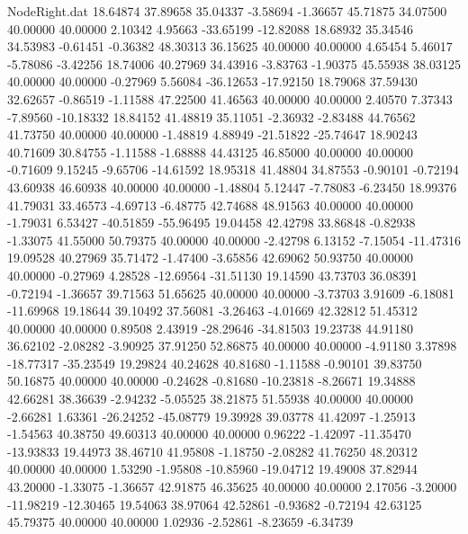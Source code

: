 \begin{filecontents}{NodeRight.dat}
  18.64874   37.89658   35.04337    -3.58694   -1.36657   45.71875   34.07500   40.00000   40.00000    2.10342    4.95663  -33.65199  -12.82088
  18.68932   35.34546   34.53983    -0.61451   -0.36382   48.30313   36.15625   40.00000   40.00000    4.65454    5.46017   -5.78086   -3.42256
  18.74006   40.27969   34.43916    -3.83763   -1.90375   45.55938   38.03125   40.00000   40.00000   -0.27969    5.56084  -36.12653  -17.92150
  18.79068   37.59430   32.62657    -0.86519   -1.11588   47.22500   41.46563   40.00000   40.00000    2.40570    7.37343   -7.89560  -10.18332
  18.84152   41.48819   35.11051    -2.36932   -2.83488   44.76562   41.73750   40.00000   40.00000   -1.48819    4.88949  -21.51822  -25.74647
  18.90243   40.71609   30.84755    -1.11588   -1.68888   44.43125   46.85000   40.00000   40.00000   -0.71609    9.15245   -9.65706  -14.61592
  18.95318   41.48804   34.87553    -0.90101   -0.72194   43.60938   46.60938   40.00000   40.00000   -1.48804    5.12447   -7.78083   -6.23450
  18.99376   41.79031   33.46573    -4.69713   -6.48775   42.74688   48.91563   40.00000   40.00000   -1.79031    6.53427  -40.51859  -55.96495
  19.04458   42.42798   33.86848    -0.82938   -1.33075   41.55000   50.79375   40.00000   40.00000   -2.42798    6.13152   -7.15054  -11.47316
  19.09528   40.27969   35.71472    -1.47400   -3.65856   42.69062   50.93750   40.00000   40.00000   -0.27969    4.28528  -12.69564  -31.51130
  19.14590   43.73703   36.08391    -0.72194   -1.36657   39.71563   51.65625   40.00000   40.00000   -3.73703    3.91609   -6.18081  -11.69968
  19.18644   39.10492   37.56081    -3.26463   -4.01669   42.32812   51.45312   40.00000   40.00000    0.89508    2.43919  -28.29646  -34.81503
  19.23738   44.91180   36.62102    -2.08282   -3.90925   37.91250   52.86875   40.00000   40.00000   -4.91180    3.37898  -18.77317  -35.23549
  19.29824   40.24628   40.81680    -1.11588   -0.90101   39.83750   50.16875   40.00000   40.00000   -0.24628   -0.81680  -10.23818   -8.26671
  19.34888   42.66281   38.36639    -2.94232   -5.05525   38.21875   51.55938   40.00000   40.00000   -2.66281    1.63361  -26.24252  -45.08779
  19.39928   39.03778   41.42097    -1.25913   -1.54563   40.38750   49.60313   40.00000   40.00000    0.96222   -1.42097  -11.35470  -13.93833
  19.44973   38.46710   41.95808    -1.18750   -2.08282   41.76250   48.20312   40.00000   40.00000    1.53290   -1.95808  -10.85960  -19.04712
  19.49008   37.82944   43.20000    -1.33075   -1.36657   42.91875   46.35625   40.00000   40.00000    2.17056   -3.20000  -11.98219  -12.30465
  19.54063   38.97064   42.52861    -0.93682   -0.72194   42.63125   45.79375   40.00000   40.00000    1.02936   -2.52861   -8.23659   -6.34739

\end{filecontents}
